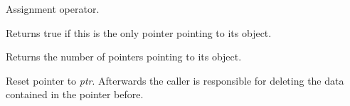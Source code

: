 Assignment operator.

\label{wxsharedptrunique}


Returns true if this is the only pointer pointing to its object.

\label{wxsharedptruse\_count}


Returns the number of pointers pointing to its object.

\label{wxsharedptrreset}


Reset pointer to {\it ptr}. Afterwards the caller is responsible
for deleting the data contained in the pointer before.

